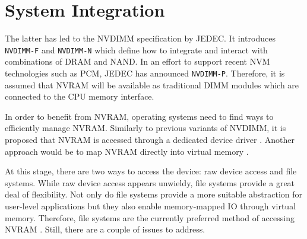 
\section{System Integration}


The latter has led to the NVDIMM specification by JEDEC. It introduces
\texttt{NVDIMM-F} and \texttt{NVDIMM-N} which define how to integrate and
interact with combinations of DRAM and NAND. In an effort to
support recent NVM technologies such as PCM, JEDEC has announced
\texttt{NVDIMM-P}\cite{jedec2017nvdimm}. Therefore, it is assumed that NVRAM
will be available as traditional DIMM modules which are connected to the CPU
memory interface\cite{condit2009better}.


In order to benefit from NVRAM, operating systems need to find ways to efficiently manage NVRAM. Similarly
to previous variants of NVDIMM, it is proposed that NVRAM is accessed
through a dedicated device driver \cite{intel2017nvdimm}. Another approach would
be to map NVRAM directly into virtual memory .

At this stage, there are two ways to access the device: raw device access and
file systems. While raw device access appears unwieldy, file systems provide a
great deal of flexibility. Not only do file systems provide a more suitable
abstraction for user-level applications but they also enable memory-mapped IO
through virtual memory. Therefore, file systems are the currently preferred
method of accessing NVRAM \cite{oukid2017data}. Still, there are a couple
of issues to address.

